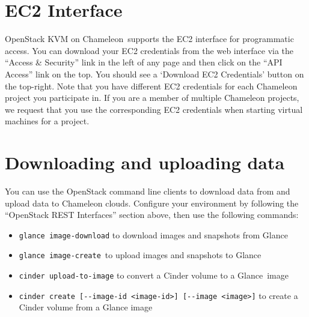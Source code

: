 \section{EC2 Interface}\label{ec2-interface}

OpenStack KVM on Chameleon~supports the EC2 interface for programmatic
access. You can download your EC2 credentials from the web interface via
the ``Access \& Security'' link in the left of any page and then click
on the ``API Access'' link on the top. You should see a `Download EC2
Credentials' button on the top-right. Note that you have different EC2
credentials for each Chameleon project you participate in. If you are a
member of multiple Chameleon projects, we request that you use the
corresponding EC2 credentials when starting virtual machines for a
project.

\section{\texorpdfstring{\protect\hypertarget{downloading_and_uploading_data}{}{Downloading
and uploading
data}}{Downloading and uploading data}}\label{downloading-and-uploading-data}

You can use the OpenStack command line clients to download data from and
upload data to Chameleon clouds. Configure your environment by following
the ``OpenStack REST Interfaces'' section above, then use the following
commands:

\begin{itemize}
\item
  \texttt{glance\ image-download} to download images and snapshots from
  Glance
\item
  \texttt{glance\ image-create}~to upload images and snapshots to Glance
\item
  \texttt{cinder~upload-to-image} to convert a Cinder volume to a
  Glance~image
\item
  \texttt{cinder\ create~{[}-\/-image-id\ \textless{}image-id\textgreater{}{]}\ {[}-\/-image\ \textless{}image\textgreater{}{]}}
  to create a Cinder volume from a Glance image
\end{itemize}


